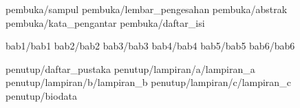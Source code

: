 \documentclass[a5paper, twoside, 11pt, listof=nochaptergap] {book}
\begin{document}

    \pagestyle {normal}

    \frontmatter
     {pembuka/sampul}
     {pembuka/lembar_pengesahan}
     {pembuka/abstrak}
     {pembuka/kata_pengantar}
     {pembuka/daftar_isi}

    \mainmatter
     {bab1/bab1} \cleardoublepage
     {bab2/bab2} \cleardoublepage
     {bab3/bab3} \cleardoublepage
     {bab4/bab4} \cleardoublepage
     {bab5/bab5} \cleardoublepage
     {bab6/bab6} \cleardoublepage

    \backmatter
     {penutup/daftar_pustaka}
     {penutup/lampiran/a/lampiran_a}
     {penutup/lampiran/b/lampiran_b}
     {penutup/lampiran/c/lampiran_c}
     {penutup/biodata}
\end{document}
